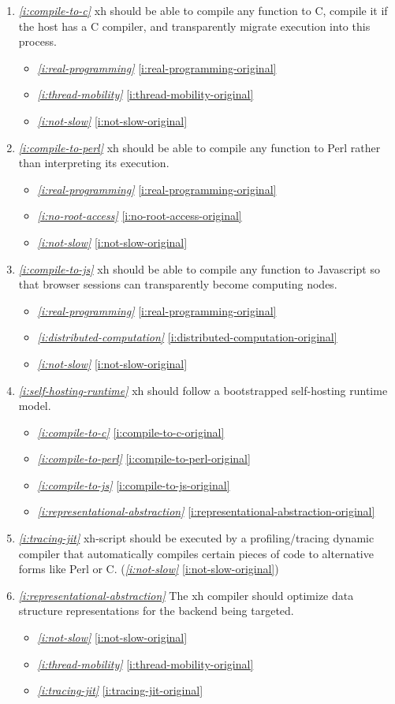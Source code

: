 \documentclass{report}
\makeatletter
\newcommand*{\Label}[2]{%
  \@bsphack
  \begingroup
    \label{#1-original}%
    \def\@currentlabel{#2}%
    \label{#1}%
  \endgroup
  \@esphack
}
\newcommand{\refboth}[1]{{\em \ref{#1}} \ref{#1-original}}
\makeatother
\begin{document}
\begin{enumerate}
\item{}\Label{i:compile-to-c}{xh2c}{\em\ref{i:compile-to-c}}
  xh should be able to compile any function to C, compile it if the host
  has a C compiler, and transparently migrate execution into this process.
\begin{itemize}
\item \refboth{i:real-programming}
\item \refboth{i:thread-mobility}
\item \refboth{i:not-slow}
\end{itemize}
\item{}\Label{i:compile-to-perl}{xh2perl}{\em\ref{i:compile-to-perl}}
  xh should be able to compile any function to Perl rather than
  interpreting its execution.
\begin{itemize}
\item \refboth{i:real-programming}
\item \refboth{i:no-root-access}
\item \refboth{i:not-slow}
\end{itemize}
\item{}\Label{i:compile-to-js}{xh2js}{\em\ref{i:compile-to-js}}
  xh should be able to compile any function to Javascript so that browser
  sessions can transparently become computing nodes.
\begin{itemize}
\item \refboth{i:real-programming}
\item \refboth{i:distributed-computation}
\item \refboth{i:not-slow}
\end{itemize}
\item{}\Label{i:self-hosting-runtime}{selfhost}{\em\ref{i:self-hosting-runtime}}
  xh should follow a bootstrapped self-hosting runtime model.
\begin{itemize}
\item \refboth{i:compile-to-c}
\item \refboth{i:compile-to-perl}
\item \refboth{i:compile-to-js}
\item \refboth{i:representational-abstraction}
\end{itemize}
\item{}\Label{i:tracing-jit}{dynamiccompiler}{\em\ref{i:tracing-jit}}
  xh-script should be executed by a profiling/tracing dynamic compiler that
  automatically compiles certain pieces of code to alternative forms like
  Perl or C.
(\refboth{i:not-slow})
\item{}\Label{i:representational-abstraction}{abstractstruct}{\em\ref{i:representational-abstraction}}
  The xh compiler should optimize data structure representations for the
  backend being targeted.
\begin{itemize}
\item \refboth{i:not-slow}
\item \refboth{i:thread-mobility}
\item \refboth{i:tracing-jit}
\end{itemize}


\end{enumerate}
\end{document}
